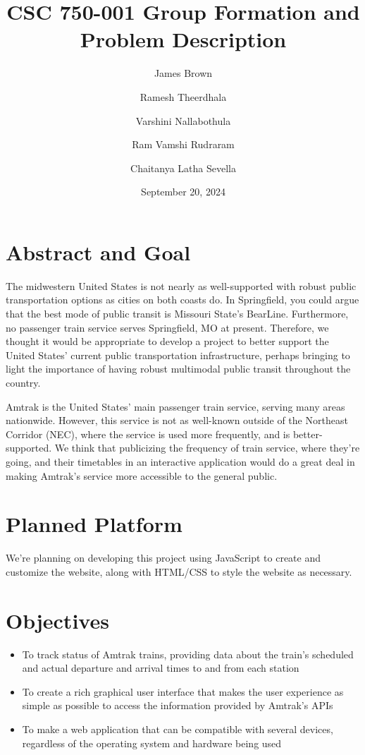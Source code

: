 \documentclass[letterpaper, 11pt, DIV = 10]{scrartcl}
\title{CSC 750-001 Group Formation and Problem Description}
\author{James Brown\and Ramesh Theerdhala\and Varshini Nallabothula\and Ram Vamshi Rudraram\and Chaitanya Latha Sevella}
\date{September 20, 2024}
\begin{document}
	\begin{titlepage}
		\maketitle
	\end{titlepage}
	
	\section*{Abstract and Goal}
		The midwestern United States is not nearly as well-supported with robust public transportation options as cities on both coasts do. In Springfield, you could argue that the best mode of public transit is Missouri State's BearLine. Furthermore, no passenger train service serves Springfield, MO at present. Therefore, we thought it would be appropriate to develop a project to better support the United States' current public transportation infrastructure, perhaps bringing to light the importance of having robust multimodal public transit throughout the country.
		
		Amtrak is the United States' main passenger train service, serving many areas nationwide. However, this service is not as well-known outside of the Northeast Corridor (NEC), where the service is used more frequently, and is better-supported. We think that publicizing the frequency of train service, where they're going, and their timetables in an interactive application would do a great deal in making Amtrak's service more accessible to the general public. %
		
	\section*{Planned Platform}
		We're planning on developing this project using JavaScript to create and customize the website, along with HTML/CSS to style the website as necessary.
		
	\section*{Objectives}
		\begin{itemize}
			\item To track status of Amtrak trains, providing data about the train's scheduled and actual departure and arrival times to and from each station
			\item To create a rich graphical user interface that makes the user experience as simple as possible to access the information provided by Amtrak's APIs
			\item To make a web application that can be compatible with several devices, regardless of the operating system and hardware being used 
		\end{itemize}
		
		
\end{document}
